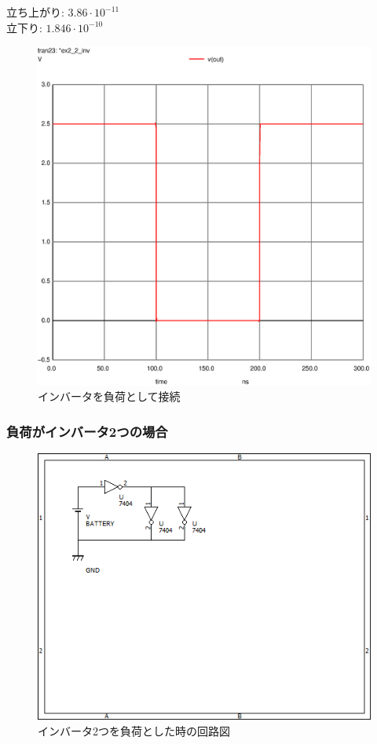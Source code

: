 \documentclass{jsarticle}
\begin{document}
\begin{flushleft}
    立ち上がり: $3.86 \cdot 10^{-11}$\\
    立下り: $1.846 \cdot 10^{-10}$
\end{flushleft}
\begin{figure}[H]
    \hspace{50pt}
    \includegraphics[scale=0.8]{ex2_2_inv.ps}
    \vspace{30pt}
    \caption{インバータを負荷として接続}
\end{figure}

\subsubsection{負荷がインバータ2つの場合}
\begin{figure}[H]
    \centering
    \includegraphics[bb=0 0 500 400]{ex2_2_double_inv.png}
    \caption{インバータ2つを負荷とした時の回路図}
\end{figure}
\end{document}
